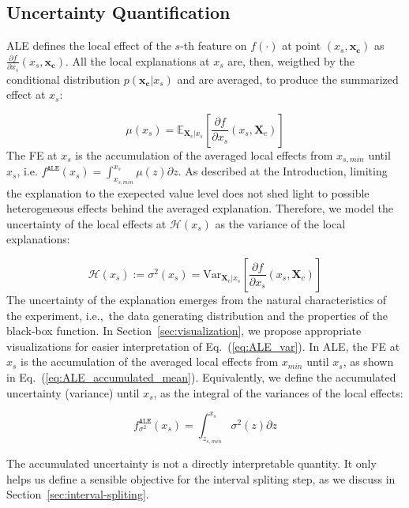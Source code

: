 \documentclass[twoside]{article}
\newcommand{\dfdx}{\frac{\partial f}{\partial x_s}}
\newcommand{\xc}{\mathbf{x_c}}
\newcommand{\Xcb}{\mathbf{X}_c}
\begin{document}
\subsection{Uncertainty Quantification}
\label{sec:NAME-definition}

ALE defines the local effect of the \(s\)-th feature on \(f(\cdot)\)
at point \((x_s, \xc)\) as \(\dfdx (x_s, \xc)\). All the local
explanations at \(x_s\) are, then, weigthed by the conditional
distribution \(p(\xc|x_s)\) and are averaged, to produce the
summarized effect at \(x_s\):

\begin{equation}
  \label{eq:ALE_mean}
  \mu(x_s) = \mathbb{E}_{\Xcb|x_s}\left [\dfdx (x_s, \Xcb)\right ]
\end{equation}
%
The FE at \(x_s\) is the accumulation of the averaged
local effects from \(x_{s, min}\) until \(x_s\), i.e.
\(f^{\mathtt{ALE}}(x_s) = \int_{x_{s, min}}^{x_s} \mu(z) \partial z
\). As described at the Introduction, limiting the explanation to the
exepected value level does not shed light to possible heterogeneous
effects behind the averaged explanation. Therefore, we model the
uncertainty of the local effects at \(\mathcal{H}(x_s)\) as the
variance of the local explanations:

\begin{equation}
  \label{eq:ALE_var}
  \mathcal{H}(x_s) := \sigma^2(x_s) = \mathrm{Var}_{\Xcb|x_s}\left [\dfdx (x_s, \Xcb) \right ]
\end{equation}
\noindent
The uncertainty of the explanation emerges from the natural
characteristics of the experiment, i.e.,~the data generating
distribution and the properties of the black-box function. In
Section~\ref{sec:visualization}, we propose appropriate visualizations
for easier interpretation of Eq.~(\ref{eq:ALE_var}). In ALE, the
FE at \(x_s\) is the accumulation of the averaged local
effects from \(x_{min}\) until \(x_s\), as shown in
Eq.~(\ref{eq:ALE_accumulated_mean}). Equivalently, we define the
accumulated uncertainty (variance) until \(x_s\), as the integral of
the variances of the local effects:

\begin{equation}
  \label{eq:ALE_accumulated_var}
  f^{\mathtt{ALE}}_{\sigma^2}(x_s) = \int_{z_{s, min}}^{x_s} \sigma^2(z) \partial z
\end{equation}
\noindent

The accumulated uncertainty is not a directly interpretable
quantity. It only helps us define a sensible objective for the
interval spliting step, as we discuss in
Section~\ref{sec:interval-spliting}.
\end{document}
